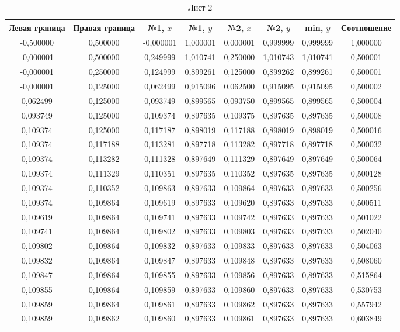 
\begin{table}[h!]
\center
\begin{tabular}{cccccccc}
\toprule
Левая граница & Правая граница 
& №1, $x$ & №1, $y$ 
& №2, $x$ & №2, $y$ 
& min, $y$
  & Соотношение \\
\midrule
-0,500000 & 0,500000 & -0,000001 & 1,000001 & 0,000001 & 0,999999 & 0,999999 & 1,000000 \\
-0,000001 & 0,500000 & 0,249999  & 1,010741 & 0,250000 & 1,010743 & 1,010741 & 0,500001 \\
-0,000001 & 0,250000 & 0,124999  & 0,899261 & 0,125000 & 0,899262 & 0,899261 & 0,500001 \\
-0,000001 & 0,125000 & 0,062499  & 0,915096 & 0,062500 & 0,915095 & 0,915095 & 0,500002 \\
0,062499  & 0,125000 & 0,093749  & 0,899565 & 0,093750 & 0,899565 & 0,899565 & 0,500004 \\
0,093749  & 0,125000 & 0,109374  & 0,897635 & 0,109375 & 0,897635 & 0,897635 & 0,500008 \\
0,109374  & 0,125000 & 0,117187  & 0,898019 & 0,117188 & 0,898019 & 0,898019 & 0,500016 \\
0,109374  & 0,117188 & 0,113281  & 0,897718 & 0,113282 & 0,897718 & 0,897718 & 0,500032 \\
0,109374  & 0,113282 & 0,111328  & 0,897649 & 0,111329 & 0,897649 & 0,897649 & 0,500064 \\
0,109374  & 0,111329 & 0,110351  & 0,897635 & 0,110352 & 0,897635 & 0,897635 & 0,500128 \\
0,109374  & 0,110352 & 0,109863  & 0,897633 & 0,109864 & 0,897633 & 0,897633 & 0,500256 \\
0,109374  & 0,109864 & 0,109619  & 0,897633 & 0,109620 & 0,897633 & 0,897633 & 0,500511 \\
0,109619  & 0,109864 & 0,109741  & 0,897633 & 0,109742 & 0,897633 & 0,897633 & 0,501022 \\
0,109741  & 0,109864 & 0,109802  & 0,897633 & 0,109803 & 0,897633 & 0,897633 & 0,502040 \\
0,109802  & 0,109864 & 0,109832  & 0,897633 & 0,109833 & 0,897633 & 0,897633 & 0,504063 \\
0,109832  & 0,109864 & 0,109847  & 0,897633 & 0,109848 & 0,897633 & 0,897633 & 0,508060 \\
0,109847  & 0,109864 & 0,109855  & 0,897633 & 0,109856 & 0,897633 & 0,897633 & 0,515864 \\
0,109855  & 0,109864 & 0,109859  & 0,897633 & 0,109860 & 0,897633 & 0,897633 & 0,530753 \\
0,109859  & 0,109864 & 0,109861  & 0,897633 & 0,109862 & 0,897633 & 0,897633 & 0,557942 \\
0,109859  & 0,109862 & 0,109860  & 0,897633 & 0,109861 & 0,897633 & 0,897633 & 0,603849 \\
\bottomrule
\end{tabular}
\caption{Лист 2}
\end{table}

